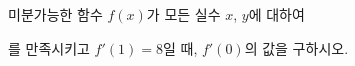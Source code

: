미분가능한 함수 $f(x)$가 모든 실수 $x$, $y$에 대하여\par\smallskip{}\par\smallskip\noindent 를 만족시키고 $f'(1)=8$일 때, $f'(0)$의 값을 구하시오.
